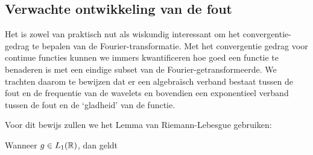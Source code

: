 \subsection{Verwachte ontwikkeling van de fout}
Het is zowel van praktisch nut als wiskundig interessant om het convergentie-gedrag te bepalen
van de Fourier-transformatie. Met het convergentie gedrag voor continue functies kunnen we immers
kwantificeren hoe goed een functie te benaderen is met een eindige subset van de Fourier-getransformeerde.
We trachten daarom te bewijzen dat er een algebra\"isch verband bestaat tussen de fout en de frequentie
van de wavelets en bovendien een exponentieel verband tussen de fout en de `gladheid' van de functie.

Voor dit bewijs zullen we het Lemma van Riemann-Lebesgue gebruiken:
\begin{lemm}
  Wanneer $g \in L_1(\mathbb{R})$, dan geldt
\end{lemm}

